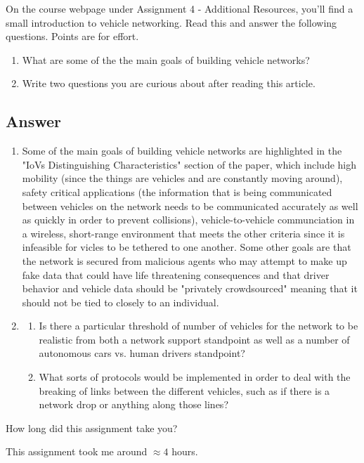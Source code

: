 \documentclass[10pt]{article}
\newenvironment{problem}[2][Problem]{\begin{trivlist}
\item[\hskip \labelsep {\bfseries #1}\hskip \labelsep {\bfseries #2.}]}{\end{trivlist}}
\begin{document}
\begin{problem}{3: Reading}
On the course webpage under Assignment 4 - Additional Resources, you'll find a small introduction to vehicle networking. Read this and answer the following questions. Points are for effort.

\begin{enumerate}
    \item What are some of the the main goals of building vehicle networks? 
    \item Write two questions you are curious about after reading this article. 
\end{enumerate}

\subsection*{Answer}
\begin{enumerate}
	\item Some of the main goals of building vehicle networks are highlighted in the "IoVs Distinguishing Characteristics" section of the paper, which include high mobility (since the things are vehicles and are constantly moving around), safety critical applications (the information that is being communicated between vehicles on the network needs to be communicated accurately as well as quickly in order to prevent collisions), vehicle-to-vehicle communciation in a wireless, short-range environment that meets the other criteria since it is infeasible for vicles to be tethered to one another. Some other goals are that the network is secured from malicious agents who may attempt to make up fake data that could have life threatening consequences and that driver behavior and vehicle data should be "privately crowdsourced" meaning that it should not be tied to closely to an individual.
	\item \begin{enumerate}
		\item Is there a particular threshold of number of vehicles for the network to be realistic from both a network support standpoint as well as a number of autonomous cars vs. human drivers standpoint?
		\item What sorts of protocols would be implemented in order to deal with the breaking of links between the different vehicles, such as if there is a network drop or anything along those lines?
	\end{enumerate}
\end{enumerate}

\end{problem}
\begin{problem}{4}
How long did this assignment take you?
\end{problem}
This assignment took me around $\approx 4$ hours.
\end{document}

